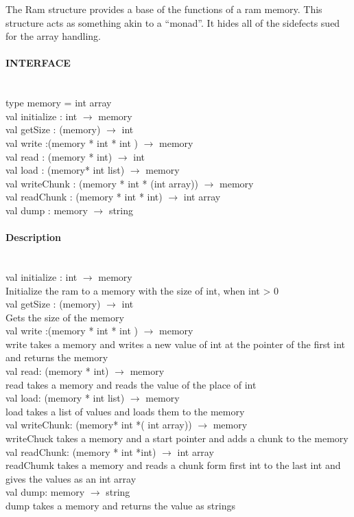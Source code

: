\documentclass{article}
\begin{document}
The Ram structure provides a base of the functions of a ram memory. This
structure acts as something akin to a ``monad''. It hides all of the sidefects
sued for the array handling.

\paragraph{INTERFACE} \
\\
    type memory = int array
	\\val initialize : int $\rightarrow$ memory
 	\\val getSize : (memory) $\rightarrow$ int
    \\val write :(memory * int * int ) $\rightarrow$ memory
	\\val read : (memory * int) $\rightarrow$ int
	\\val load : (memory* int list) $\rightarrow$ memory
	\\val writeChunk : (memory * int * (int array)) $\rightarrow$ memory
	\\val readChunk : (memory * int * int) $\rightarrow$ int array
	\\val dump : memory $\rightarrow$ string
\paragraph{Description} \
\\
val initialize : int $\rightarrow$ memory \\
	Initialize the ram to a memory with the size of int, when int > 0
\\
val getSize : (memory) $\rightarrow$ int\\
		Gets the size of the memory
\\
val write :(memory * int * int ) $\rightarrow$ memory\\
		write takes a memory and writes a new value of int at the pointer of the first
		int and returns the memory
\\
val read: (memory * int) $\rightarrow$ memory\\
		read takes a memory and reads the value of the place of int
\\
val load: (memory * int list) $\rightarrow$ memory\\
		load takes a list of values and loads them to the memory
\\
val writeChunk: (memory* int *( int array)) $\rightarrow$ memory \\
		writeChuck takes a memory and a start pointer and adds a chunk to the memory
\\
val readChunk: (memory * int *int) $\rightarrow$ int array \\
		readChumk takes a memory and reads a chunk form first int to the last int and gives the values as an int array
\\
val dump: memory $\rightarrow$ string\\
		dump takes a memory and returns the value as strings
\end{document}
